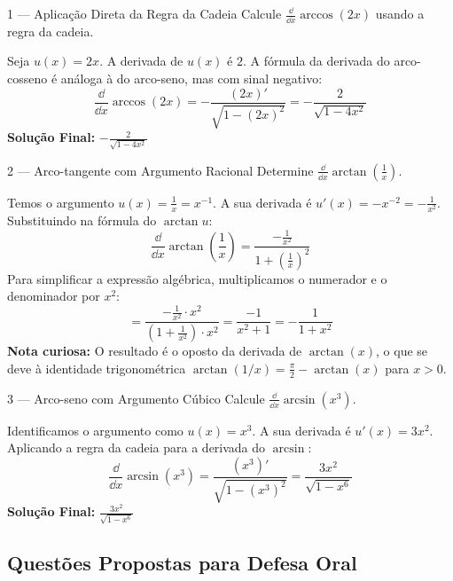 \begin{exercisebox}{1 --- Aplicação Direta da Regra da Cadeia}
  Calcule $\displaystyle \frac{\dd}{\dd x}\arccos(2x)$ usando a regra da cadeia.
\end{exercisebox}
\begin{solbox}
  Seja $u(x) = 2x$. A derivada de $u(x)$ é $2$.
  A fórmula da derivada do arco-cosseno é análoga à do arco-seno, mas com sinal negativo:
  \[
    \frac{\dd}{\dd x}\arccos(2x) = -\frac{(2x)'}{\sqrt{1-(2x)^2}} = -\frac{2}{\sqrt{1-4x^2}}
  \]
  \textbf{Solução Final:} $\boxed{-\frac{2}{\sqrt{1-4x^2}}}$
\end{solbox}

\begin{exercisebox}{2 --- Arco-tangente com Argumento Racional}
  Determine $\displaystyle \frac{\dd}{\dd x}\arctan\left(\frac{1}{x}\right)$.
\end{exercisebox}
\begin{solbox}
  Temos o argumento $u(x) = \frac{1}{x} = x^{-1}$. A sua derivada é $u'(x) = -x^{-2} = -\frac{1}{x^2}$.
  Substituindo na fórmula do $\arctan u$:
  \[
    \frac{\dd}{\dd x}\arctan\left(\frac{1}{x}\right) = \frac{-\frac{1}{x^2}}{1+\left(\frac{1}{x}\right)^2}
  \]
  Para simplificar a expressão algébrica, multiplicamos o numerador e o denominador por $x^2$:
  \[
    = \frac{-\frac{1}{x^2} \cdot x^2}{\left(1+\frac{1}{x^2}\right) \cdot x^2} = \frac{-1}{x^2+1} = -\frac{1}{1+x^2}
  \]
  \textbf{Nota curiosa:} O resultado é o oposto da derivada de $\arctan(x)$, o que se deve à identidade trigonométrica $\arctan(1/x) = \frac{\pi}{2} - \arctan(x)$ para $x>0$.
\end{solbox}

\begin{exercisebox}{3 --- Arco-seno com Argumento Cúbico}
  Calcule $\displaystyle \frac{\dd}{\dd x}\arcsin(x^3)$.
\end{exercisebox}
\begin{solbox}
  Identificamos o argumento como $u(x) = x^3$. A sua derivada é $u'(x) = 3x^2$.
  Aplicando a regra da cadeia para a derivada do $\arcsin$:
  \[
    \frac{\dd}{\dd x}\arcsin(x^3) = \frac{(x^3)'}{\sqrt{1-(x^3)^2}} = \frac{3x^2}{\sqrt{1-x^6}}
  \]
  \textbf{Solução Final:} $\boxed{\frac{3x^2}{\sqrt{1-x^6}}}$
\end{solbox}


\subsection{Questões Propostas para Defesa Oral}

